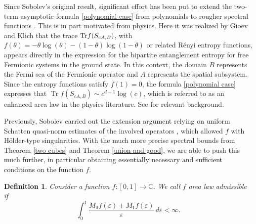 \documentclass[12pt]{amsart}
\numberwithin{equation}{section}
\newcommand{\Cm}{\mathbb{C}}
\newcommand{\eps}{\varepsilon}
\newtheorem{definition}{Definition}
\begin{document}
Since Sobolev's original result, significant effort has been put to extend the two-term asymptotic formula \eqref{polynomial case} from polynomials to rougher spectral functions \cite{Sobolev_quasi_est,Sobolev_quasi_abstract}. This is in part motivated from physics. Here it was realized by Gioev and Klich \cite{Gioev_Klich} that the trace ${\rm Tr}f(S_{cA,B})$, with $f(\theta) = -\theta \log(\theta) - (1-\theta)\log(1-\theta)$ or related Rényi entropy functions, appears directly in the expression for the bipartite entanglement entropy for free Fermionic systems in the ground state. In this context, the domain $B$ represents the Fermi sea of the Fermionic operator and $A$ represents the spatial subsystem. Since the entropy functions satisfy $f(1) = 0$, the formula \eqref{polynomial case} expresses that $\operatorname{Tr} f(S_{cA,B}) \sim c^{d-1}\log(c)$, which is referred to as an enhanced area law in the physics literature. See \cite{Eisert_review} for relevant background. 

Previously, Sobolev carried out the extension argument relying on uniform Schatten quasi-norm estimates of the involved operators \cite{Sobolev_quasi_abstract}, which allowed $f$ with Hölder-type singularities. With the much more precise spectral bounds from Theorem \ref{two cubes} and Theorem \ref{union and good}, we are able to push this much further, in particular obtaining essentially necessary and sufficient conditions on the function $f$. 


\begin{definition}
Consider a function $f:[0,1] \to \Cm$. We call $f$ area law admissible if
\begin{equation}\label{area law condition}
\int_{0}^1 \frac{M_0 f(\eps) + M_1 f(\eps)}{\eps} \, d\eps < \infty.
\end{equation}
\end{definition}
\end{document}
